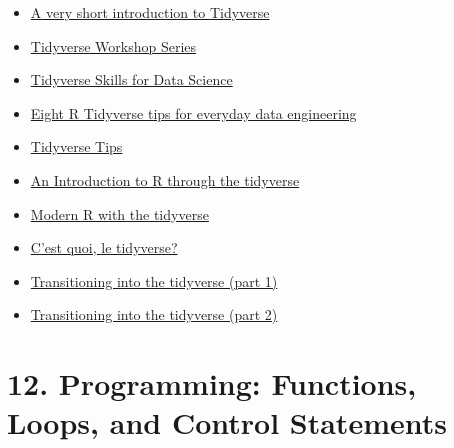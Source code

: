 \documentclass[
  letterpaper,
  DIV=11,
  numbers=noendperiod]{scrreprt}
\providecommand{\tightlist}{%
  \setlength{\itemsep}{0pt}\setlength{\parskip}{0pt}}\usepackage{longtable,booktabs,array}
\begin{document}
\begin{itemize}
\tightlist
\item
  \href{https://dominicroye.github.io/en/2020/a-very-short-introduction-to-tidyverse/}{A
  very short introduction to Tidyverse}
\item
  \href{https://github.com/nuitrcs/r-tidyverse}{Tidyverse Workshop
  Series}
\item
  \href{https://jhudatascience.org/tidyversecourse/}{Tidyverse Skills
  for Data Science}
\item
  \href{https://tomaztsql.wordpress.com/2022/07/14/eight-r-tidyverse-tips-for-everyday-data-engineering/}{Eight
  R Tidyverse tips for everyday data engineering}
\item
  \href{https://oliviergimenez.github.io/tidyverse-tips/}{Tidyverse
  Tips}
\item
  \href{https://pmacdasci.github.io/r-intro-tidyverse/}{An Introduction
  to R through the tidyverse}
\item
  \href{http://modern-rstats.eu/}{Modern R with the tidyverse}
\item
  \href{https://thinkr.fr/c-est-quoi-le-tidyverse/\#Mettre_en_forme_ses_donnees_avec_la_package_tidyr}{C'est
  quoi, le tidyverse?}
\item
  \href{https://www.rebeccabarter.com/blog/2019-08-05_base_r_to_tidyverse/}{Transitioning
  into the tidyverse (part 1)}
\item
  \href{https://www.rebeccabarter.com/blog/2019-08-05_base_r_to_tidyverse_pt2/}{Transitioning
  into the tidyverse (part 2)}
\end{itemize}

\section{12. Programming: Functions, Loops, and Control
Statements}\label{programming-functions-loops-and-control-statements}
\end{document}
